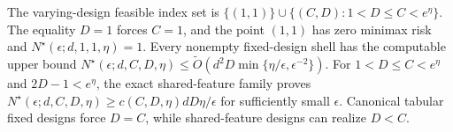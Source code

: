 The varying-design feasible index set is \(\{(1,1)\}\cup\{(C,D):1<D\le C<e^\eta\}\). The equality \(D=1\) forces \(C=1\), and the point \((1,1)\) has zero minimax risk and \(N^\star(\epsilon;d,1,1,\eta)=1\). Every nonempty fixed-design shell has the computable upper bound \(N^\star(\epsilon;d,C,D,\eta)\le\widetilde O(d^2D\min\{\eta/\epsilon,\epsilon^{-2}\})\). For \(1<D\le C<e^\eta\) and \(2D-1<e^\eta\), the exact shared-feature family proves \(N^\star(\epsilon;d,C,D,\eta)\ge c(C,D,\eta)dD\eta/\epsilon\) for sufficiently small \(\epsilon\). Canonical tabular fixed designs force \(D=C\), while shared-feature designs can realize \(D<C\).
